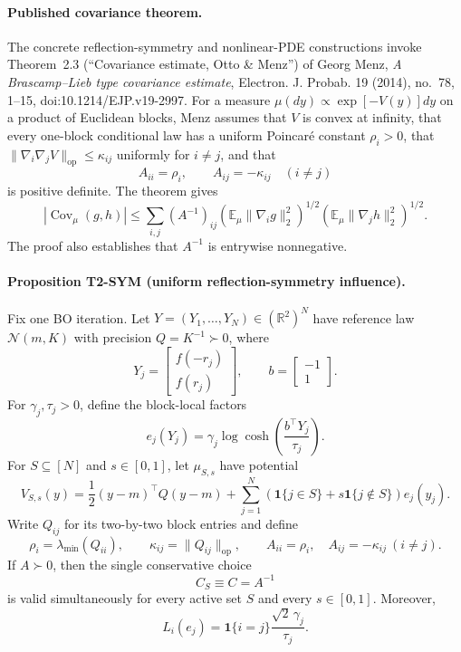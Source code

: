 \paragraph{Published covariance theorem.}
The concrete reflection-symmetry and nonlinear-PDE constructions invoke Theorem~2.3
(``Covariance estimate, Otto \& Menz'') of Georg Menz,
\emph{A Brascamp--Lieb type covariance estimate}, Electron. J. Probab. 19
(2014), no.~78, 1--15, doi:10.1214/EJP.v19-2997.  For a measure
$\mu(dy)\propto\exp[-V(y)]dy$ on a product of Euclidean blocks, Menz assumes
that $V$ is convex at infinity, that every one-block conditional law has a
uniform Poincar\'e constant $\rho_i>0$, that
$\|\nabla_i\nabla_jV\|_{\mathrm{op}}\le\kappa_{ij}$ uniformly for $i\ne j$,
and that
\[
    A_{ii}=\rho_i,
    \qquad
    A_{ij}=-\kappa_{ij}\quad(i\ne j)
\]
is positive definite.  The theorem gives
\begin{equation}
 |\operatorname{Cov}_{\mu}(g,h)|
 \le
 \sum_{i,j}(A^{-1})_{ij}
 \left(\mathbb E_{\mu}\|\nabla_i g\|_2^2\right)^{1/2}
 \left(\mathbb E_{\mu}\|\nabla_j h\|_2^2\right)^{1/2}.
 \label{eq:menz-covariance}
\end{equation}
The proof also establishes that $A^{-1}$ is entrywise nonnegative.

\paragraph{Proposition T2-SYM (uniform reflection-symmetry influence).}
Fix one BO iteration.  Let
$Y=(Y_1,\ldots,Y_N)\in(\mathbb R^2)^N$ have reference law
$\mathcal N(m,K)$ with precision $Q=K^{-1}\succ0$, where
\[
    Y_j=\begin{bmatrix}f(-r_j)\\f(r_j)\end{bmatrix},
    \qquad
    b=\begin{bmatrix}-1\\1\end{bmatrix}.
\]
For $\gamma_j,\tau_j>0$, define the block-local factors
\[
    e_j(Y_j)
    =\gamma_j\log\cosh\!\left(\frac{b^\top Y_j}{\tau_j}\right).
\]
For $S\subseteq[N]$ and $s\in[0,1]$, let $\mu_{S,s}$ have potential
\begin{equation}
 V_{S,s}(y)
 =\frac12(y-m)^\top Q(y-m)
 +\sum_{j=1}^N
 \left(\mathbf 1\{j\in S\}+s\mathbf 1\{j\notin S\}\right)e_j(y_j).
 \label{eq:symmetry-potential}
\end{equation}
Write $Q_{ij}$ for its two-by-two block entries and define
\begin{equation}
 \rho_i=\lambda_{\min}(Q_{ii}),
 \qquad
 \kappa_{ij}=\|Q_{ij}\|_{\mathrm{op}},
 \qquad
 A_{ii}=\rho_i,
 \quad
 A_{ij}=-\kappa_{ij}\ (i\ne j).
 \label{eq:symmetry-comparison}
\end{equation}
If $A\succ0$, then the single conservative choice
\[
    C_S\equiv C=A^{-1}
\]
is valid simultaneously for every active set $S$ and every $s\in[0,1]$.
Moreover,
\begin{equation}
    L_i(e_j)=\mathbf 1\{i=j\}\frac{\sqrt2\,\gamma_j}{\tau_j}.
    \label{eq:symmetry-factor-sensitivity}
\end{equation}

